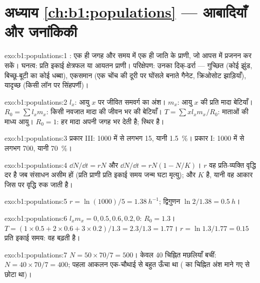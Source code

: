\section*{अध्याय \ref{ch:b1:populations} --- आबादियाँ और जनांकिकी}

\begin{solution}{exo:b1:populations:1}
: एक ही जगह और समय में एक ही जाति के प्राणी,
जो आपस में प्रजनन कर सकें। घनत्व: प्रति इकाई क्षेत्रफल या आयतन प्राणी।
परिक्षेपण: उनका दिक्-ढर्रा --- गुच्छित (कोई झुंड, बिच्छू-बूटी का कोई
धब्बा), एकसमान (एक चोंच की दूरी पर घोंसले बनाते गैनेट, क्रिओसोट झाड़ियाँ),
यादृच्छ (किसी लॉन पर सिंहपर्णी)।
\end{solution}

\begin{solution}{exo:b1:populations:2}
$l_x$: आयु $x$ पर जीवित समवर्ग का अंश। $m_x$: आयु $x$ की प्रति
मादा बेटियाँ। $R_0 = \sum l_x m_x$: किसी नवजात मादा की जीवन भर की
बेटियाँ। $T = \sum x l_x m_x / R_0$: माताओं की माध्य आयु।
$R_0 = 1$: हर मादा अपनी जगह भर देती है;  स्थिर है।
\end{solution}

\begin{solution}{exo:b1:populations:3}
प्रकार III: 1000 में से लगभग 15, यानी \qty{1.5}{\%}। प्रकार I: 1000 में
से लगभग 700, यानी \qty{70}{\%}।
\end{solution}

\begin{solution}{exo:b1:populations:4}
$\dd N/\dd t = rN$ और $\dd N/\dd t = rN(1 - N/K)$। $r$ वह
प्रति-व्यक्ति वृद्धि दर है जब संसाधन असीम हों (प्रति प्राणी प्रति इकाई
समय जन्म घटा मृत्यु); और $K$  है, यानी
वह आकार जिस पर वृद्धि रुक जाती है।
\end{solution}

\begin{solution}{exo:b1:populations:5}
$r = \ln(1000)/5 = \qty{1.38}{h^{-1}}$; द्विगुणन $\ln 2/1.38 =
\qty{0.5}{h}$।
\end{solution}

\begin{solution}{exo:b1:populations:6}
$l_x m_x = 0, 0.5, 0.6, 0.2, 0$: $R_0 = 1.3$। $T = (1\times 0.5 +
2\times 0.6 + 3\times 0.2)/1.3 = 2.3/1.3 = 1.77$। $r = \ln 1.3/1.77 =
\qty{0.15}{}$ प्रति इकाई समय: वह बढ़ती है।
\end{solution}

\begin{solution}{exo:b1:populations:7}
$N = 50\times 70/7 = 500$। केवल 40 चिह्नित मछलियाँ बचीं: $N = 40\times
70/7 = 400$; पहला आकलन एक-चौथाई से बहुत ऊँचा था ( का चिह्नित
अंश माने गए से छोटा था)।
\end{solution}

